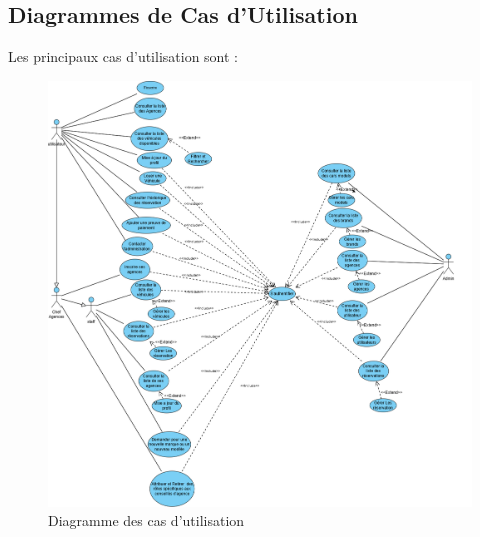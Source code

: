 \subsection{Diagrammes de Cas d'Utilisation}
Les principaux cas d'utilisation sont :

\begin{figure}[h!]
    \centering
    \includegraphics[width=1\textwidth]{docs/rapport/Use Case Pfe (3).png}
    \caption{Diagramme des cas d'utilisation}
    \label{fig:usecase_diagram}
\end{figure}

